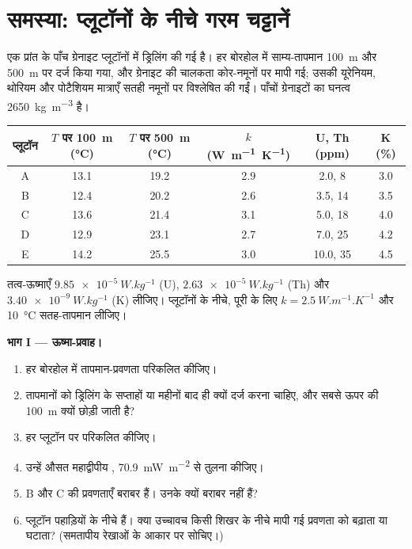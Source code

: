 \section{समस्या: प्लूटॉनों के नीचे गरम चट्टानें}

\begin{problem}
\label{pb:b1:heat-budget:1}
एक प्रांत के पाँच ग्रेनाइट प्लूटॉनों में ड्रिलिंग की गई है। हर बोरहोल में साम्य-तापमान \qty{100}{m} और \qty{500}{m} पर दर्ज किया गया, और ग्रेनाइट की चालकता कोर-नमूनों पर मापी गई; उसकी यूरेनियम, थोरियम और पोटैशियम मात्राएँ सतही नमूनों पर विश्लेषित की गईं। पाँचों ग्रेनाइटों का घनत्व \qty{2650}{kg.m^{-3}} है।
\begin{center}
\small
\begin{tabular}{cccccc}
\hline
प्लूटॉन & $T$ पर \qty{100}{m} (\unit{\degreeCelsius}) & $T$ पर \qty{500}{m} (\unit{\degreeCelsius}) & $k$ (\unit{W.m^{-1}.K^{-1}}) & U, Th (ppm) & K (\unit{\percent}) \\
\hline
A & 13.1 & 19.2 & 2.9 & 2.0, 8 & 3.0 \\
B & 12.4 & 20.2 & 2.6 & 3.5, 14 & 3.5 \\
C & 13.6 & 21.4 & 3.1 & 5.0, 18 & 4.0 \\
D & 12.9 & 23.1 & 2.7 & 7.0, 25 & 4.2 \\
E & 14.2 & 25.5 & 3.0 & 10.0, 35 & 4.5 \\
\hline
\end{tabular}
\end{center}
तत्व-ऊष्माएँ $\qty{9.85e-5}{W.kg^{-1}}$ (U), $\qty{2.63e-5}{W.kg^{-1}}$ (Th) और $\qty{3.40e-9}{W.kg^{-1}}$ (K) लीजिए। प्लूटॉनों के नीचे, पूरी  के लिए $k = \qty{2.5}{W.m^{-1}.K^{-1}}$ और \qty{10}{\degreeCelsius} सतह-तापमान लीजिए।

\medskip
\noindent\textbf{भाग I --- ऊष्मा-प्रवाह।}
\begin{enumerate}
  \item हर बोरहोल में तापमान-प्रवणता परिकलित कीजिए।
  \item तापमानों को ड्रिलिंग के सप्ताहों या महीनों बाद ही क्यों दर्ज करना चाहिए, और सबसे ऊपर की \qty{100}{m} क्यों छोड़ी जाती है?
  \item हर प्लूटॉन पर  परिकलित कीजिए।
  \item उन्हें औसत महाद्वीपीय , \qty{70.9}{mW.m^{-2}} से तुलना कीजिए।
  \item B और C की प्रवणताएँ बराबर हैं। उनके  क्यों बराबर नहीं हैं?
  \item प्लूटॉन पहाड़ियों के नीचे हैं। क्या उच्चावच किसी शिखर के नीचे मापी गई प्रवणता को बढ़ाता या घटाता? (समतापीय रेखाओं के आकार पर सोचिए।)
\end{enumerate}


\end{problem}
